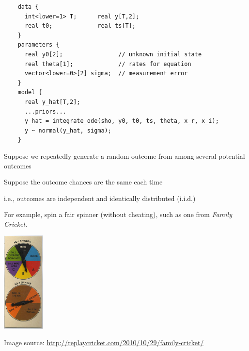 \documentclass[10pt]{report}
\begin{document}
%
{\footnotesize
\begin{Verbatim}
    data {
      int<lower=1> T;      real y[T,2];
      real t0;             real ts[T];
    }
    parameters {
      real y0[2];                // unknown initial state
      real theta[1];             // rates for equation
      vector<lower=0>[2] sigma;  // measurement error
    }
    model {
      real y_hat[T,2];
      ...priors...
      y_hat = integrate_ode(sho, y0, t0, ts, theta, x_r, x_i);
      y ~ normal(y_hat, sigma);
    }
\end{Verbatim}
}





%

\noindent
\begin{minipage}[t]{0.69\textwidth}
\vspace*{-1.9in}
\begin{subitemize}
\item Suppose we repeatedly generate a random outcome from among
several potential outcomes
\item Suppose the outcome chances are the same each time
\begin{subsubitemize}
\item i.e., outcomes are independent and identically distributed (i.i.d.)
\end{subsubitemize}
\item For example, spin a fair spinner (without cheating), such as one from \emph{Family Cricket}.
\end{subitemize}
\end{minipage}
%
\begin{minipage}[t]{0.29\textwidth}
\hfill \includegraphics[height=2in]{img/family-cricket-spinner.jpg}
\end{minipage}
\vfill
\hfill {\tiny Image source: \url{http://replaycricket.com/2010/10/29/family-cricket/}}
\end{document}
